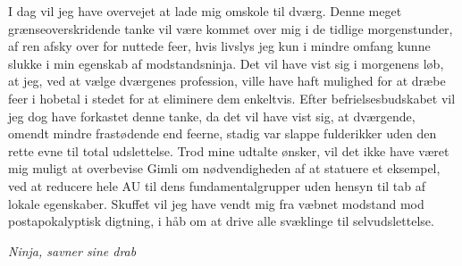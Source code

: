 \begin{minipage}[t]{100mm}
I dag vil jeg have overvejet at lade mig omskole til dværg. Denne meget grænseoverskridende tanke vil være kommet over mig i de tidlige morgenstunder, af ren afsky over for nuttede feer, hvis livslys jeg kun i mindre omfang kunne slukke i min egenskab af modstandsninja. Det vil have vist sig i morgenens løb, at jeg, ved at vælge dværgenes profession, ville have haft mulighed for at dræbe feer i hobetal i stedet for at eliminere dem enkeltvis. Efter befrielsesbudskabet vil jeg dog have forkastet denne tanke, da det vil have vist sig, at dværgende, omendt mindre frastødende end feerne, stadig var slappe fulderikker uden den rette evne til total udslettelse. Trod mine udtalte ønsker, vil det ikke have været mig muligt at overbevise Gimli om nødvendigheden af at statuere et eksempel, ved at reducere hele AU til dens fundamentalgrupper uden hensyn til tab af lokale egenskaber. Skuffet vil jeg have vendt mig fra væbnet modstand mod postapokalyptisk digtning, i håb om at drive alle svæklinge til selvudslettelse.

{\flushright\emph{Ninja, savner sine drab}}


\end{minipage}

